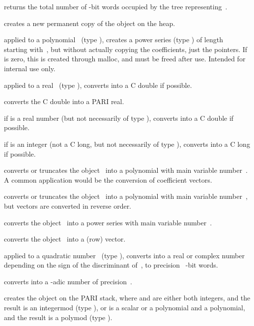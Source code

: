  returns the total number of \B-bit words occupied
by the tree representing~.

 creates a new permanent copy of the object 
on the heap.

 applied to a
polynomial~ (type ), creates a power series (type )
of length~ starting with~, but without actually copying the
coefficients, just the pointers. If  is zero, this is created
through malloc, and must be freed after use. Intended for internal use only.

 applied to a real~ (type ),
converts  into a C double if possible.

 converts the C double  into a PARI real.

 if  is a real number (but not
necessarily of type ), converts  into a C double if possible.

 if  is an integer (not a C long,
but not necessarily of type ), converts  into a C long
if possible.

 converts or truncates the object~
into a polynomial with main variable number~. A common application
would be the conversion of coefficient vectors.

 converts or truncates the object~
into a polynomial with main variable number~, but vectors are converted
in reverse order.

 converts the object~ into a power
series with main variable number~.

 converts the object~ into a (row) vector.

 applied to a quadratic number~
(type ), converts  into a real or complex number
depending on the sign of the discriminant of~, to precision
\hbox{ \B-bit} words.%

 converts  into a -adic
number of precision~.

 creates the object 
on the PARI stack, where  and  are either both integers, and
the result is an integermod (type ), or  is a scalar or
a polynomial and  a polynomial, and the result is a polymod
(type ).

